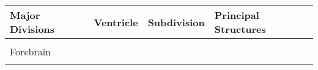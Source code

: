 \begin{table}[ht]
      \centering
      \begin{tabular}{l l l l}
            \toprule
            \textbf{Major Divisions} & \textbf{Ventricle}                                       & \textbf{Subdivision}          & \textbf{Principal Structures} \\
            \midrule

            \multirow{7}{*}{Forebrain}
                                     & \multirow{5}{*}{\underline{\hspace{3cm}}}
                                     & \multirow{4}{*}{\underline{\hspace{3cm}}}
                                     & \underline{\hspace{3cm}}                                                                                   \\
                                     &                                                          &
                                     & \underline{\hspace{3cm}}                                                                                   \\
                                     &                                                          &
                                     & \underline{\hspace{3cm}}                                                                                     \\
                                     &                                                          &
                                     & \underline{\hspace{3cm}}                                                                                     \\[0.5em]
            \cline{3-4}                                                                                                                                         \\[-0.5em]
                                     & \multirow{2}{*}{\underline{\hspace{3cm}}}             & \multirow{2}{*}{\underline{\hspace{3cm}}}
                                     & \underline{\hspace{3cm}}                                                                                          \\
                                     &                                                          &
                                     & \underline{\hspace{3cm}}                                                                                      \\
            \midrule


\end{tabular}
\end{table}
